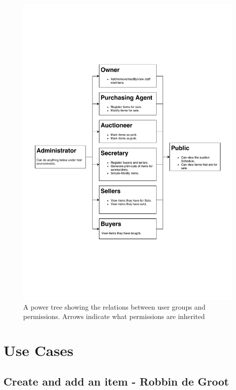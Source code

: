 \documentclass{article}
\begin{document}
\begin{figure}[H]
	\centering
	\includegraphics[scale=.75]{power_tree.pdf}
	\caption*{A power tree showing the relations between user groups and permissions. Arrows indicate what permissions are inherited}
\end{figure}

\section*{Use Cases}
\subsection*{Create and add an item - Robbin de Groot}
\end{document}
